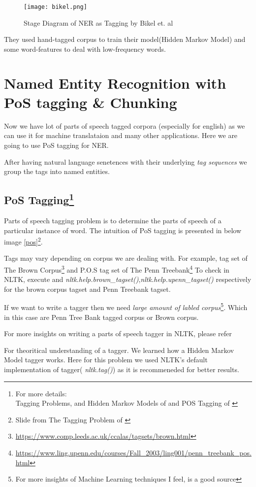 \documentclass[12pt]{report}
\begin{document}
\begin{figure}[htp]
\centering
\texttt{[image: bikel.png]}
\caption{Stage Diagram of NER as Tagging by Bikel et. al}
\label{NERasT}
\end{figure}

They used hand-tagged corpus to train their model(Hidden Markov Model\cite{hmm}) and some
 word-features to deal with low-frequency words. 
 
\section{Named Entity Recognition with PoS tagging \& Chunking}
\par Now we have lot of parts of speech tagged corpora (especially for english) as we can
 use it for machine translataion and many other applications. Here we are going to use 
 PoS tagging for NER. \par After having natural language senetences with their underlying \textit{
 tag sequences} we group the tags into named entities.

\subsection{PoS Tagging\footnote{For more details:\\Tagging Problems, and Hidden Markov Models of \cite{mc} and POS Tagging of \cite{SNLP}}}
\par Parts of speech tagging problem is to determine the parts of speech of a particular
instance of word. The intuition of PoS tagging is presented in below image \ref{pos}\footnote{Slide from
 The Tagging Problem of \cite{mc}}.
\par Tags may vary depending on corpus we are dealing with. For example, tag set of The Brown Corpus\footnote{\url{https://www.comp.leeds.ac.uk/ccalas/tagsets/brown.html}} and P.O.S tag set of The Penn Treebank\footnote{\url{https://www.ling.upenn.edu/courses/Fall_2003/ling001/penn_treebank_pos.html}}
To check in NLTK, execute and \textit{nltk.help.brown\_tagset()},\textit{nltk.help.upenn\_tagset()} respectively for the brown corpus tagset and Penn Treebank tagset.
\par If we want to write a tagger then we need \textit{large amount of labled corpus}\footnote{For more insights of 
Machine Learning techniques I feel, \cite{Videos} is a good source}. Which in this case
 are Penn Tree Bank tagged corpus or Brown corpus.
\par For more insights on writing a parts of speech tagger in NLTK, please refer\cite{tag}
\par For theoritical understanding of a tagger. We learned how a Hidden Markov Model tagger\cite{hmm}
 works. Here for this problem we used NLTK's default implementation of tagger(\textit{
 nltk.tag()}) as it is recommeneded for better results.
\end{document}
